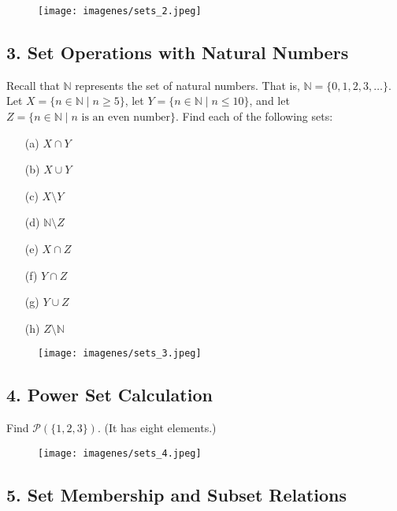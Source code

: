 \documentclass{article}
\begin{document}
\begin{figure}[H]
\centering
\texttt{[image: imagenes/sets\_2.jpeg]}
\end{figure}



\subsection*{3. Set Operations with Natural Numbers}

Recall that $\mathbb{N}$ represents the set of natural numbers. That is, $\mathbb{N} = \{0,1,2,3,\dots\}$. Let $X = \{n \in \mathbb{N} \mid n \geq 5\}$, let $Y = \{n \in \mathbb{N} \mid n \leq 10\}$, and let $Z = \{n \in \mathbb{N} \mid n \textrm{ is an even number}\}$. Find each of the following sets:

\begin{enumerate}
    \item[(a)] $X \cap Y$
    \item[(b)] $X \cup Y$
    \item[(c)] $X \setminus Y$
    \item[(d)] $\mathbb{N} \setminus Z$
    \item[(e)] $X \cap Z$
    \item[(f)] $Y \cap Z$
    \item[(g)] $Y \cup Z$
    \item[(h)] $Z \setminus \mathbb{N}$
\end{enumerate}


\begin{figure}[H]
\centering
\texttt{[image: imagenes/sets\_3.jpeg]}
\end{figure}



\subsection*{4. Power Set Calculation}

Find $\mathcal{P}(\{1,2,3\})$. (It has eight elements.)

\begin{figure}[H]
\centering
\texttt{[image: imagenes/sets\_4.jpeg]}
\end{figure}

\subsection*{5. Set Membership and Subset Relations}
\end{document}
